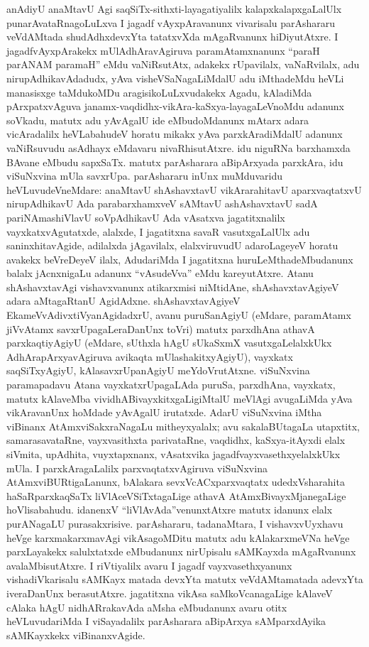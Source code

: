 anAdiyU anaMtavU Agi saqSiTx-sithxti-layagatiyalilx kalapxkalapxgaLalUlx punarA\-vataRnagoLuLxva I jagadf vAyxpAravanunx vivarisalu parAshararu veVdAMtada shudAdhx\-devxYta tatatxvXda mAgaRvanunx hiDiyutAtxre. I jagadfvAyxpArakekx mUlAdhAravAgiruva paramAtamxnanunx ``paraH parANAM paramaH'' eMdu vaNiRsutAtx, adakekx rUpavilalx, vaNaR\-vilalx, adu nirupAdhikavAdadudx, yAva visheVSaNagaLiMdalU adu iMthadeMdu heVLi manasisxge taMdukoMDu aragisikoLuLxvudakekx Agadu, kAladiMda pArxpatxvAguva janamx-\-vaqdidhx-vikAra-kaSxya-layagaLeVnoMdu adanunx soVkadu, matutx adu yAvAgalU ide eMbudoMdanunx mAtarx adara vicAradalilx heVLabahudeV horatu mikakx yAva parxkAradiMdalU adanunx vaNiRsuvudu asAdhayx eMdavaru nivaRhisu\-tAtxre. idu niguRNa barxhamxda BAvane eMbudu sapxSaTx. matutx parAsharara aBi\-pArxyada parxkAra, idu viSuNxvina mUla savxrUpa. parAshararu inUnx muMduvaridu heVLuvu\-deVneMdare: anaMtavU shAshavxtavU vikArarahitavU aparxvaqtatxvU nirupAdhikavU Ada parabarxhamxveV sAMtavU ashAshavxtavU sadA pariNAmashiVlavU soVpAdhikavU Ada vAsatxva jagatitxnalilx vayxkatxvAgutatxde, alalxde, I jagatitxna savaR vasutxgaLalUlx adu saninxhita\-vAgide, adilalxda jAgavilalx, elalxviruvudU adaroLageyeV horatu avakekx beVreDeyeV ilalx, Aduda\-riMda I jagatitxna huruLeMthadeMbudanunx balalx jAcnxnigaLu adanunx ``vAsudeVva'' eMdu kareyutAtxre. Atanu shAshavxtavAgi vishavxvanunx atikarxmisi niMtidAne, shAshavxtavAgiyeV adara aMtagaRtanU AgidAdxne. shAshavxtavAgiyeV EkameVvAdivxtiVyanAgidadxrU, avanu puruSanAgiyU (eMdare, paramAtamx jiVvAtamx savxrUpagaLeraDanUnx toVri) matutx parxdhAna athavA parxkaqtiyAgiyU (eMdare, sUthxla hAgU sUkaSxmX vasutxgaLelalxkUkx AdhArapArxyavAgiruva avikaqta mUlashakitxyAgiyU), vayxkatx saqSiTxyAgiyU, kAla\-savxrUpanAgiyU meYdoVrutAtxne. viSuNxvina paramapadavu Atana vayxkatxrUpagaLAda puruSa, parxdhAna, vayxkatx, matutx kAlaveMba vividhABivayxkitxgaLigiMtalU meVlAgi avu\-gaLiMda yAva vikAravanUnx hoMdade yAvAgalU irutatxde. AdarU viSuNx\-vina iMtha viBinanx AtAmxviSakxraNagaLu mitheyxyalalx; avu sakalaBUtagaLa utapxtitx, samarasa\-vataRne, vayxvasithxta parivataRne, vaqdidhx, kaSxya-itAyxdi elalx siVmita, upAdhita, vuyxtapxnanx, vAsatxvika jagadfvayxvasethxyelalxkUkx mUla. I parxkAragaLalilx parxvaqtatxvAgiruva viSuNxvina AtAmxviBURtigaLanunx, bAlakara sevxVcACxparxvaqtatx udedxVsharahita haSaRparxkaqSaTx liVlAceVSiTxta\-gaLige athavA AtAmxBivayxMjanegaLige hoVlisabahudu. idanenxV ``liVlAvAda''venunxtAtxre matutx idanunx elalx purANagaLU purasakxrisive. parAshararu, tada\-naMtara, I vishavx\-vUyxhavu heVge karxmakarxmavAgi vikAsagoMDitu matutx adu kAlakarxmeVNa heVge parxLayakekx salulxtatxde eMbudanunx nirUpisalu sAMKayxda mAgaRvanunx avalaMbisutAtxre. I riVti\-yalilx avaru I jagadf vayxvasethxyanunx vishadiVkarisalu sAMKayx matada devxYta matutx veVdAMtamatada adevxYta iveraDanUnx berasutAtxre. jagatitxna vikAsa saMkoVcanagaLige kAlaveV cAlaka hAgU nidhARrakavAda aMsha eMbudanunx avaru otitx heVLuvudariMda I viSayadalilx parAsharara aBipArxya sAMparxdAyika sAMKayxkekx viBinanx\-vAgide.

